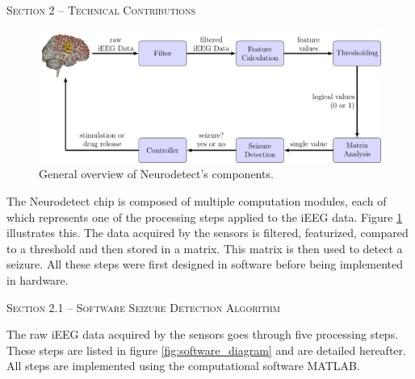 \documentclass[usletter, 11pt]{extarticle}
\begin{document}
\vspace{11pt}
\textsc{Section 2 – Technical Contributions}
\vspace{11pt}

\begin{figure}[!h]
	\centering
	\includegraphics[width = \textwidth]{img/overview_diagram.pdf}
	\caption{General overview of Neurodetect's components.}
	\label{fig:overview_diagram}
\end{figure}
 
The Neurodetect chip is composed of multiple computation modules, each of which represents one of the processing steps applied to the iEEG data. Figure \ref{fig:overview_diagram} illustrates this. The data acquired by the sensors is filtered, featurized, compared to a threshold and then stored in a matrix. This matrix is then used to detect a seizure. All these steps were first designed in software before being implemented in hardware.

\vspace{11pt}
\textsc{Section 2.1 – Software Seizure Detection Algorithm}
\vspace{11pt}

The raw iEEG data acquired by the sensors goes through five processing steps. These steps are listed in figure \ref{fig:software_diagram} and are detailed hereafter. All steps are implemented using the computational software MATLAB.
\end{document}
